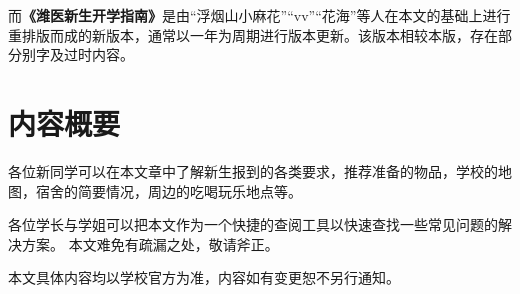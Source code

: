 而\textbf{《潍医新生开学指南》}是由“浮烟山小麻花”“vv”“花海”等人在本文的基础上进行重排版而成的新版本，通常以一年为周期进行版本更新。该版本相较本版，存在部分别字及过时内容。

\textbf{}

\section[内容概要]{内容概要}
\vspace{-1em}

各位新同学可以在本文章中了解新生报到的各类要求，推荐准备的物品，学校的地图，宿舍的简要情况，周边的吃喝玩乐地点等。

各位学长与学姐可以把本文作为一个快捷的查阅工具以快速查找一些常见问题的解决方案。
\bigbreak
本文难免有疏漏之处，敬请斧正。

本文具体内容均以学校官方为准，内容如有变更恕不另行通知。